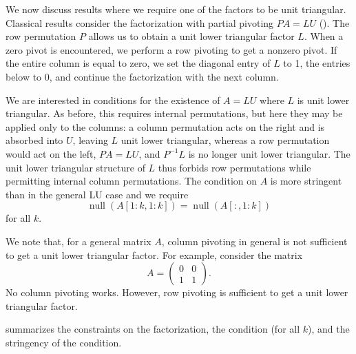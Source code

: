 \documentclass[final]{siamart1116}
\numberwithin{theorem}{section}
\DeclareMathOperator{\nl}{null}
\begin{document}
We now discuss results where we require one of the factors to be unit triangular. Classical results consider the factorization with partial pivoting $PA = LU$ (). The row permutation $P$ allows us to obtain a unit lower triangular factor $L$. When a zero pivot is encountered, we perform a row pivoting to get a nonzero pivot. If the entire column is equal to zero, we set the diagonal entry of $L$ to 1, the entries below to 0, and continue the factorization with the next column.

We are interested in conditions for the existence of $A=LU$ where $L$ is unit lower triangular. As before, this requires internal permutations, but here they may be applied only to the columns: a column permutation acts on the right and is absorbed into $U$, leaving $L$ unit lower triangular, whereas a row permutation would act on the left, $PA=LU$, and $P^{-1}L$ is no longer unit lower triangular. The unit lower triangular structure of $L$ thus forbids row permutations while permitting internal column permutations. The condition on $A$ is more stringent than in the general LU case and we require
\[
  \nl(A[1:k,1:k]) = \nl(A[:,1:k])
\]
for all $k$.

We note that, for a general matrix $A$, column pivoting in general is not sufficient to get a unit lower triangular factor. For example, consider the matrix
\[
  A =
  \begin{pmatrix}
    0 & 0 \\
    1 & 1
  \end{pmatrix}.
\]
No column pivoting works. However, row pivoting is sufficient to get a unit lower triangular factor.

 summarizes the constraints on the factorization, the condition (for all $k$), and the stringency of the condition.
\end{document}
